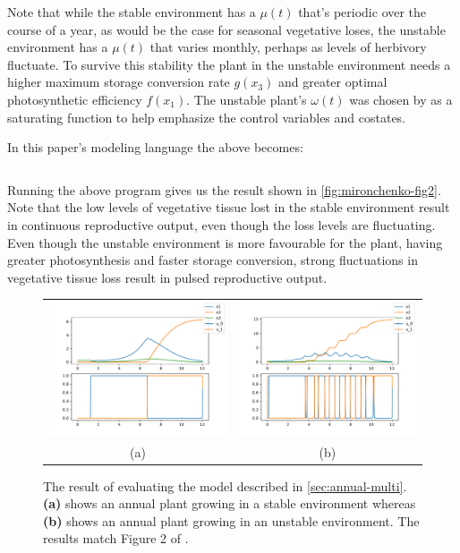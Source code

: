 \documentclass{article}
\begin{document}
Note that while the stable environment has a $\mu(t)$ that's periodic over the course of a year, as would be the case for seasonal vegetative loses, the unstable environment has a $\mu(t)$ that varies monthly, perhaps as levels of herbivory fluctuate. To survive this stability the plant in the unstable environment needs a higher maximum storage conversion rate $g(x_3)$ and greater optimal photosynthetic efficiency $f(x_1)$. The unstable plant's $\omega(t)$ was chosen by \citeauthor{mironchenko_optimal_2014} as a saturating function to help emphasize the control variables and costates.

In this paper's modeling language the above becomes:

\inputminted[firstline=5,frame=single,linenos]{python}{src/Mironchenko2014_figure2.py}

Running the above program gives us the result shown in \autoref{fig:mironchenko-fig2}. Note that the low levels of vegetative tissue lost in the stable environment result in continuous reproductive output, even though the loss levels are fluctuating. Even though the unstable environment is more favourable for the plant, having greater photosynthesis and faster storage conversion, strong fluctuations in vegetative tissue loss result in pulsed reproductive output.

\begin{figure}
  \centering
  \begin{tabular}{cc}
    \includegraphics[width=3in]{imgs/Mironchenko_figure2a.pdf} &
    \includegraphics[width=3in]{imgs/Mironchenko_figure2b.pdf} \\
    (a) & (b)
  \end{tabular}
  \caption{The result of evaluating the model described in \autoref{sec:annual-multi}. \textbf{(a)} shows an annual plant growing in a stable environment whereas \textbf{(b)} shows an annual plant growing in an unstable environment. The results match Figure 2 of \citep{mironchenko_optimal_2014}.\label{fig:mironchenko-fig2}}
\end{figure}
\end{document}
